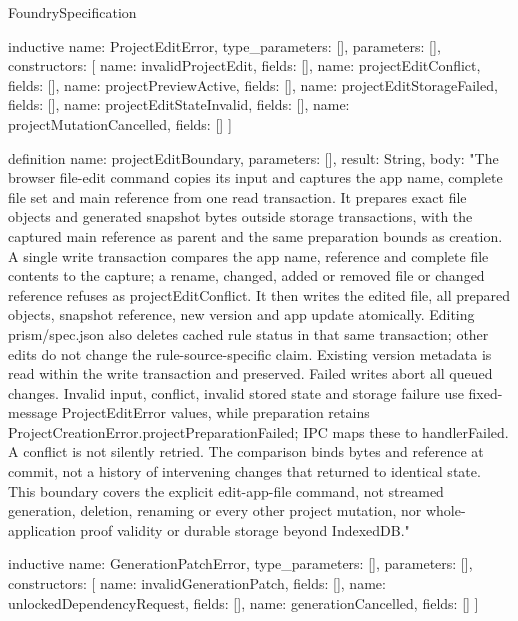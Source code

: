 \begin{lexlean}{FoundrySpecification}
\begin{semanticmodule}
inductive{
  name: ProjectEditError,
  type_parameters: [],
  parameters: [],
  constructors: [
    {name: invalidProjectEdit, fields: []},
    {name: projectEditConflict, fields: []},
    {name: projectPreviewActive, fields: []},
    {name: projectEditStorageFailed, fields: []},
    {name: projectEditStateInvalid, fields: []},
    {name: projectMutationCancelled, fields: []}
  ]
}

definition{
  name: projectEditBoundary,
  parameters: [],
  result: String,
  body: "The browser file-edit command copies its input and captures the app name, complete file set and main reference from one read transaction. It prepares exact file objects and generated snapshot bytes outside storage transactions, with the captured main reference as parent and the same preparation bounds as creation. A single write transaction compares the app name, reference and complete file contents to the capture; a rename, changed, added or removed file or changed reference refuses as projectEditConflict. It then writes the edited file, all prepared objects, snapshot reference, new version and app update atomically. Editing prism/spec.json also deletes cached rule status in that same transaction; other edits do not change the rule-source-specific claim. Existing version metadata is read within the write transaction and preserved. Failed writes abort all queued changes. Invalid input, conflict, invalid stored state and storage failure use fixed-message ProjectEditError values, while preparation retains ProjectCreationError.projectPreparationFailed; IPC maps these to handlerFailed. A conflict is not silently retried. The comparison binds bytes and reference at commit, not a history of intervening changes that returned to identical state. This boundary covers the explicit edit-app-file command, not streamed generation, deletion, renaming or every other project mutation, nor whole-application proof validity or durable storage beyond IndexedDB."
}

inductive{
  name: GenerationPatchError,
  type_parameters: [],
  parameters: [],
  constructors: [
    {name: invalidGenerationPatch, fields: []},
    {name: unlockedDependencyRequest, fields: []},
    {name: generationCancelled, fields: []}
  ]
}


\end{semanticmodule}
\end{lexlean}
